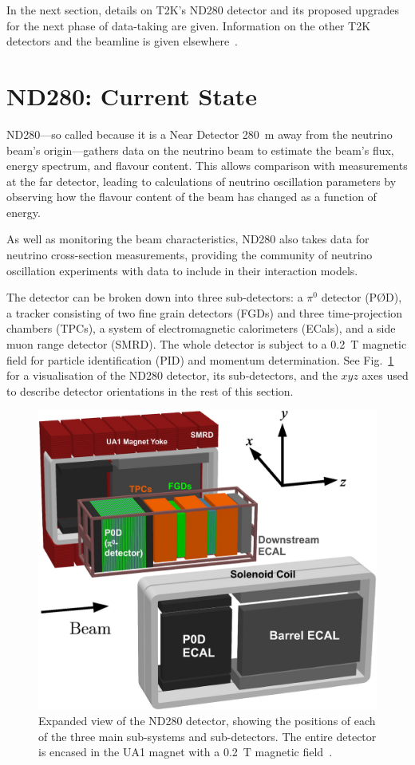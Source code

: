 \documentclass[aps,pra,12pt,notitlepage,tightenlines]{revtex4-1}
\begin{document}
In the next section, details on T2K's ND280 detector and its proposed upgrades for the next phase of data-taking are given. Information on the other T2K detectors and the beamline is given elsewhere~\cite{ABE2011106}.

\section{ND280: Current State}
ND280---so called because it is a Near Detector 280~m away from the neutrino beam's origin---gathers data on the neutrino beam to estimate the beam's flux, energy spectrum, and flavour content. This allows comparison with measurements at the far detector, leading to calculations of neutrino oscillation parameters by observing how the flavour content of the beam has changed as a function of energy. 

As well as monitoring the beam characteristics, ND280 also takes data for neutrino cross-section measurements, providing the community of neutrino oscillation experiments with data to include in their interaction models. 

The detector can be broken down into three sub-detectors: a $\pi^0$ detector (P\O D), a tracker consisting of two fine grain detectors (FGDs) and three time-projection chambers (TPCs), a system of electromagnetic calorimeters (ECals), and a side muon range detector (SMRD). The whole detector is subject to a 0.2~T magnetic field for particle identification (PID) and momentum determination. See Fig.\ \ref{fig:ND} for a visualisation of the ND280 detector, its sub-detectors, and the $xyz$ axes used to describe detector orientations in the rest of this section.
\begin{figure}
 \includegraphics[scale=1]{ND280.png}
 \caption{Expanded view of the ND280 detector, showing the positions of each of the three main sub-systems and sub-detectors. The entire detector is encased in the UA1 magnet with a 0.2~T magnetic field~\cite{ABE2011106}.}
 \label{fig:ND}
\end{figure}
\end{document}
